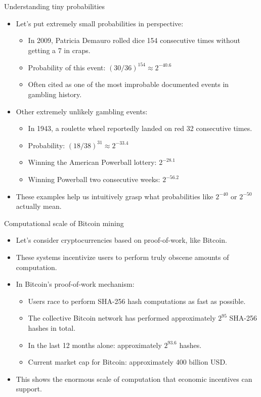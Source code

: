 \documentclass[aspectratio=169, lualatex, handout]{beamer}
\begin{document}
\begin{frame}{Understanding tiny probabilities}
	\begin{itemize}
		\item Let's put extremely small probabilities in perspective:
		      \begin{itemize}
			      \item In 2009, Patricia Demauro rolled dice 154 consecutive times without getting a 7 in craps.
			      \item Probability of this event: $(30/36)^{154} \approx 2^{-40.6}$
			      \item Often cited as one of the most improbable documented events in gambling history.
		      \end{itemize}
		\item Other extremely unlikely gambling events:
		      \begin{itemize}
			      \item In 1943, a roulette wheel reportedly landed on red 32 consecutive times.
			      \item Probability: $(18/38)^{31} \approx 2^{-33.4}$
			      \item Winning the American Powerball lottery: $2^{-28.1}$
			      \item Winning Powerball two consecutive weeks: $2^{-56.2}$
		      \end{itemize}
		\item These examples help us intuitively grasp what probabilities like $2^{-40}$ or $2^{-50}$ actually mean.
	\end{itemize}
\end{frame}

\begin{frame}{Computational scale of Bitcoin mining}
	\begin{itemize}
		\item Let's consider cryptocurrencies based on proof-of-work, like Bitcoin.
		\item These systems incentivize users to perform truly obscene amounts of computation.
		\item In Bitcoin's proof-of-work mechanism:
		      \begin{itemize}
			      \item Users race to perform SHA-256 hash computations as fast as possible.
			      \item The collective Bitcoin network has performed approximately $2^{95}$ SHA-256 hashes in total.
			      \item In the last 12 months alone: approximately $2^{93.6}$ hashes.
			      \item Current market cap for Bitcoin: approximately 400 billion USD.
		      \end{itemize}
		\item This shows the enormous scale of computation that economic incentives can support.
	\end{itemize}
\end{frame}
\end{document}
